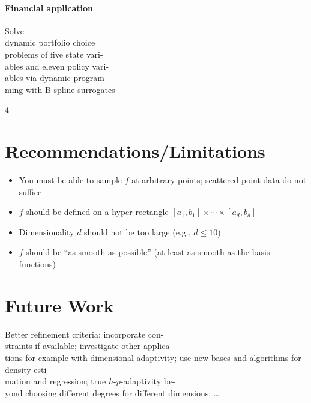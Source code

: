 \documentclass[
  nofoldmark,
  portrait,
  12pt,
]{leaflet}
\newcommand*{\objfun}{f}
\begin{document}
  \vspace{-2.5em}
  \vspace{-30mm}
  
  \paragraph{Financial application}
  
  Solve\\
  dynamic portfolio choice\\
  problems of five state vari-\\
  ables and eleven policy vari-\\
  ables via dynamic program-\\
  ming with B-spline surrogates
  
  \clearpage
  
  
  
  \hfill{}4\vspace{-3.7em}
  
  \section{Recommendations/Limitations}
  
  \begin{itemize}
    \item
    You must be able to sample $\objfun$ at arbitrary points;
    scattered point data do not suffice
    
    \item
    $\objfun$ should be defined on a hyper-rectangle
    $[a_1, b_1] \times \dotsb \times [a_d, b_d]$
    
    \item
    Dimensionality $d$ should not be too large (e.g., $d \le 10$)
    
    \item
    $\objfun$ should be ``as smooth as possible''
    (at least as smooth as the basis functions)
  \end{itemize}
  
  \section{Future Work}
  
  Better refinement criteria;
  incorporate con-\\straints if available;
  investigate other applica-\\tions for example
  with dimensional adaptivity;
  use new bases and algorithms for density esti-\\mation and regression;
  true $h$-$p$-adaptivity be-\\yond choosing different degrees
  for different dimensions; \dots
  
\end{document}
